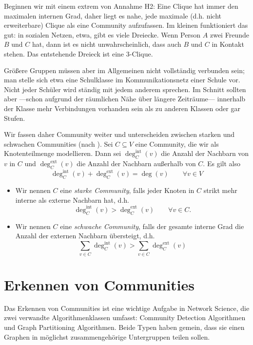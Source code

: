 Beginnen wir mit einem extrem von Annahme H2:
Eine Clique hat immer den maximalen internen Grad, daher liegt es nahe, jede maximale (d.h. nicht erweiterbare) Clique als eine Community aufzufassen.
Im kleinen funktioniert das gut: in sozialen Netzen, etwa, gibt es viele Dreiecke.
Wenn Person $A$ zwei Freunde $B$ und $C$ hat, dann ist es nicht unwahrscheinlich, dass auch $B$ und $C$ in Kontakt stehen.
Das entstehende Dreieck ist eine 3-Clique.

Größere Gruppen müssen aber im Allgemeinen nicht vollständig verbunden sein;
man stelle sich etwa eine Schulklasse im Kommunikationsnetz einer Schule vor.
Nicht jeder Schüler wird ständig mit jedem anderem sprechen.
Im Schnitt sollten aber ---schon aufgrund der räumlichen Nähe über längere Zeiträume--- innerhalb der Klasse mehr Verbindungen vorhanden sein als zu anderen Klassen oder gar Stufen.

\def\intdeg{\deg^\text{int}_C}
\def\extdeg{\deg^\text{ext}_C}

Wir fassen daher Community weiter und unterscheiden zwischen starken und schwachen Communities (nach \cite{barabasi2014network}).
Sei $C \subseteq V$ eine Community, die wir als Knotenteilmenge modellieren.
Dann sei $\intdeg(v)$ die Anzahl der Nachbarn von $v$ in $C$ und $\extdeg(v)$ die Anzahl der Nachbarn außerhalb von $C$.
Es gilt also
\begin{equation}
    \intdeg(v) + \extdeg(v) = \deg(v) \qquad \forall v \in V
\end{equation}

\begin{itemize}
    \item Wir nennen $C$ eine \emph{starke Community}, falls jeder Knoten in $C$ strikt mehr interne als externe Nachbarn hat, d.h.
          \begin{equation}
              \intdeg(v) > \extdeg(v) \qquad \forall v \in C.
          \end{equation}

    \item Wir nennen $C$ eine \emph{schwache Community}, falls der gesamte interne Grad die Anzahl der externen Nachbarn übersteigt, d.h.
          \begin{equation}
              \sum_{v\in C}\intdeg(v) > \sum_{v\in C} \extdeg(v)
          \end{equation}
\end{itemize}

\section{Erkennen von Communities}
Das Erkennen von Communities ist eine wichtige Aufgabe in Network Science, die zwei verwandte Algorithmenklassen umfasst:
Community Detection Algorithmen und Graph Partitioning Algorithmen.
Beide Typen haben gemein, dass sie einen Graphen in möglichst zusammengehörige Untergruppen teilen sollen.

